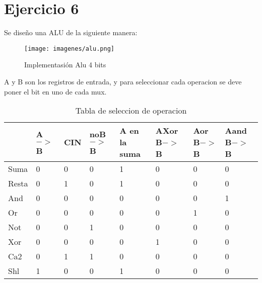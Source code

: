 \documentclass[../../../informe/src/main.tex]{subfiles}
\begin{document}
\section{Ejercicio 6}

Se diseño una ALU de la siguiente manera:
\begin{figure}[H]
\centering
\texttt{[image: imagenes/alu.png]}
\caption{Implementasión Alu 4 bits} \label{fig=alu}
\end{figure}
 A y B son los registros de entrada, y para seleccionar cada operacion se deve poner el bit en uno de cada mux.

\begin{table}[h]
\begin{center}
\begin{tabular}{|l|l|l|l|l|l|l|l|}
\hline
&A$->$B & CIN &noB$->$B  &  A en la suma & AXor B$->$B & Aor B$->$B &Aand B$->$B\\
\hline \hline
 Suma& 0 & 0 & 0 & 1 & 0&0 &0 \\ \hline
Resta& 0 & 1 & 0 & 1 & 0&0 &0 \\ \hline
 And& 0 & 0 & 0 & 0 & 0&0 &1 \\ \hline
 Or& 0 & 0 & 0 & 0 & 0&1 &0 \\ \hline
 Not& 0 & 0 & 1 & 0 & 0&0 &0 \\ \hline
 Xor& 0 & 0 & 0 & 0 & 1&0 &0 \\ \hline
 Ca2& 0 & 1 & 1& 0& 0&0 &0 \\ \hline
Shl& 1 & 0 & 0 & 1 & 0&0 &0 \\ \hline

\end{tabular}
\caption{Tabla de seleccion de operacion} 
\label{tab=alu op}
\end{center}
\end{table}
\end{document}
